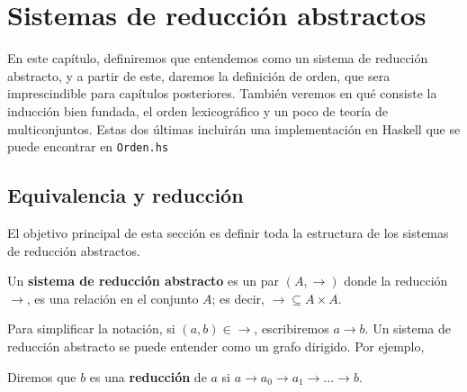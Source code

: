 \chapter{Sistemas de reducción abstractos}

En este capítulo, definiremos que entendemos como un sistema de
reducción abstracto, y a partir de este, daremos la definición de
orden, que sera imprescindible para capítulos posteriores. También
veremos en qué consiste la inducción bien fundada, el orden
lexicográfico y un poco de teoría de multiconjuntos. Estas dos últimas
incluirán una implementación en Haskell que se puede encontrar en
\texttt{Orden.hs}


\section{Equivalencia y reducción}

El objetivo principal de esta sección es definir toda la estructura de
los sistemas de reducción abstractos.

\begin{defi} 
  Un \textbf{sistema de reducción abstracto} es un par $(A, \rightarrow)$ donde
  la reducción $\rightarrow$, es una relación en el conjunto $A$; es decir,
  $\rightarrow \subseteq A \times A$.
\end{defi}

Para simplificar la notación, si $(a,b) \in \rightarrow$, escribiremos
$a\rightarrow b$.  Un sistema de reducción abstracto se puede entender
como un grafo dirigido. Por ejemplo,

\begin{figure}[h]
          \centering
\end{figure}

\begin{defi} 
  Diremos que $b$ es una \textbf{reducción} de $a$ si
  $a\rightarrow a_0 \rightarrow a_1\rightarrow \dots\rightarrow b$.
\end{defi}


